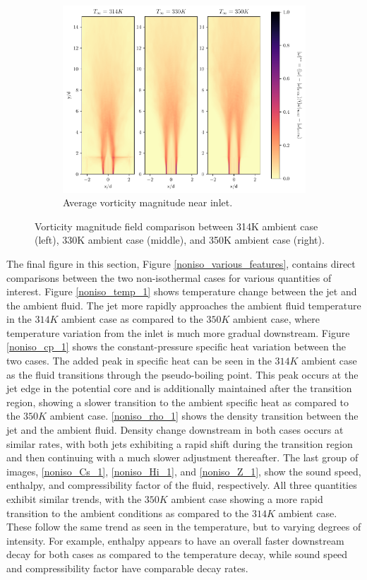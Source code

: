 \begin{figure}[htbp!]
\begin{subfigure}{0.5\textwidth}
	\includegraphics[scale=.45]{figures/Plots/vertical/magvort_scaled_vert_avg_all_zoom.pdf}
	\caption{Average vorticity magnitude near inlet.} \label{all_magvort_3}
\end{subfigure}
\caption{Vorticity magnitude field comparison between 314K ambient case (left), 330K ambient case (middle), and 350K ambient case (right).}
\label{all_magvort_features}
\end{figure}

The final figure in this section, Figure \ref{noniso_various_features}, contains direct comparisons between the two non-isothermal cases for various quantities of interest. Figure \ref{noniso_temp_1} shows temperature change between the jet and the ambient fluid. The jet more rapidly approaches the ambient fluid temperature in the $314 K$ ambient case as compared to the $350 K$ ambient case, where temperature variation from the inlet is much more gradual downstream. Figure \ref{noniso_cp_1} shows the constant-pressure specific heat variation between the two cases. The added peak in specific heat can be seen in the $314 K$ ambient case as the fluid transitions through the pseudo-boiling point. This peak occurs at the jet edge in the potential core and is additionally maintained after the transition region, showing a slower transition to the ambient specific heat as compared to the $350 K $ ambient case. \ref{noniso_rho_1} shows the density transition between the jet and the ambient fluid. Density change downstream in both cases occurs at similar rates, with both jets exhibiting a rapid shift during the transition region and then continuing with a much slower adjustment thereafter. The last group of images, \ref{noniso_Cs_1}, \ref{noniso_Hi_1}, and \ref{noniso_Z_1}, show the sound speed, enthalpy, and compressibility factor of the fluid, respectively. All three quantities exhibit similar trends, with the $350 K$ ambient case showing a more rapid transition to the ambient conditions as compared to the $314 K$ ambient case. These follow the same trend as seen in the temperature, but to varying degrees of intensity. For example, enthalpy appears to have an overall faster downstream decay for both cases as compared to the temperature decay, while sound speed and compressibility factor have comparable decay rates. 

